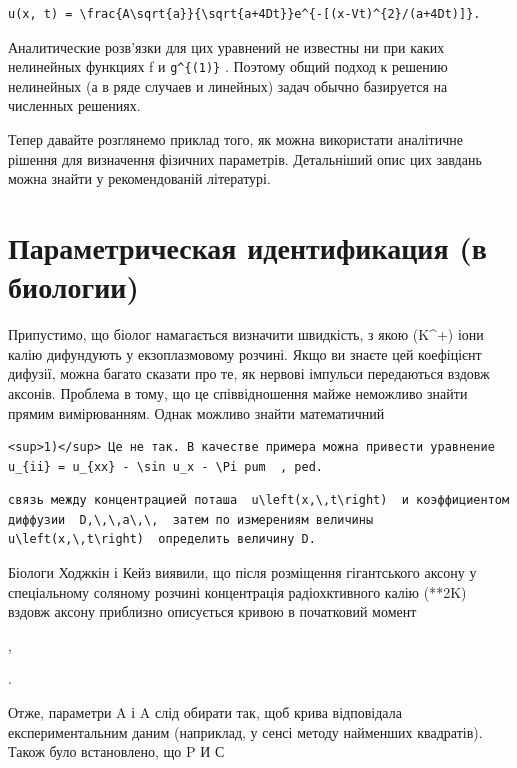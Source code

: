 \documentclass[
  ukrainian,
]{article}
\begin{document}
\begin{verbatim}
u(x, t) = \frac{A\sqrt{a}}{\sqrt{a+4Dt}}e^{-[(x-Vt)^{2}/(a+4Dt)]}.
\end{verbatim}

Аналитические розв'язки для цих уравнений не известны ни при каких
нелинейных функциях f и \texttt{g\^{}\{(1)\}} . Поэтому общий подход к
решению нелинейных (а в ряде случаев и линейных) задач обычно базируется
на численных решениях.

Тепер давайте розглянемо приклад того, як можна використати аналітичне
рішення для визначення фізичних параметрів. Детальніший опис цих завдань
можна знайти у рекомендованій літературі.

\section{Параметрическая идентификация (в
биологии)}\label{ux43fux430ux440ux430ux43cux435ux442ux440ux438ux447ux435ux441ux43aux430ux44f-ux438ux434ux435ux43dux442ux438ux444ux438ux43aux430ux446ux438ux44f-ux432-ux431ux438ux43eux43bux43eux433ux438ux438}

Припустимо, що біолог намагається визначити швидкість, з якою (K\^{}+)
іони калію дифундують у екзоплазмовому розчині. Якщо ви знаєте цей
коефіцієнт дифузії, можна багато сказати про те, як нервові імпульси
передаються вздовж аксонів. Проблема в тому, що це співвідношення майже
неможливо знайти прямим вимірюванням. Однак можливо знайти математичний

\begin{verbatim}
<sup>1)</sup> Це не так. В качестве примера можна привести уравнение  u_{ii} = u_{xx} - \sin u_x - \Pi pum  , ped.
\end{verbatim}

\begin{verbatim}
связь между концентрацией поташа  u\left(x,\,t\right)  и коэффициентом диффузии  D,\,\,a\,\,  затем по измерениям величины  u\left(x,\,t\right)  определить величину D.
\end{verbatim}

Біологи Ходжкін і Кейз виявили, що після розміщення гігантського аксону
у спеціальному соляному розчині концентрація радіохктивного калію (**2K)
вздовж аксону приблизно описується кривою в початковий момент

,

.

Отже, параметри A і A слід обирати так, щоб крива відповідала
експериментальним даним (наприклад, у сенсі методу найменших квадратів).
Також було встановлено, що P И С
\end{document}
